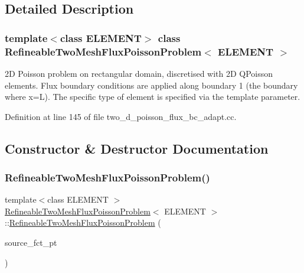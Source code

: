 \subsection{Detailed Description}
\subsubsection*{template$<$class E\+L\+E\+M\+E\+NT$>$\newline
class Refineable\+Two\+Mesh\+Flux\+Poisson\+Problem$<$ E\+L\+E\+M\+E\+N\+T $>$}

2D Poisson problem on rectangular domain, discretised with 2D Q\+Poisson elements. Flux boundary conditions are applied along boundary 1 (the boundary where x=L). The specific type of element is specified via the template parameter. 

Definition at line 145 of file two\+\_\+d\+\_\+poisson\+\_\+flux\+\_\+bc\+\_\+adapt.\+cc.



\subsection{Constructor \& Destructor Documentation}
\mbox{\label{classRefineableTwoMeshFluxPoissonProblem_a6568980564c4e39544b1c2bcb71cf3b6}} 
\subsubsection{\texorpdfstring{Refineable\+Two\+Mesh\+Flux\+Poisson\+Problem()}{RefineableTwoMeshFluxPoissonProblem()}}
{\footnotesize\ttfamily template$<$class E\+L\+E\+M\+E\+NT $>$ \\
\hyperlink{classRefineableTwoMeshFluxPoissonProblem}{Refineable\+Two\+Mesh\+Flux\+Poisson\+Problem}$<$ E\+L\+E\+M\+E\+NT $>$\+::\hyperlink{classRefineableTwoMeshFluxPoissonProblem}{Refineable\+Two\+Mesh\+Flux\+Poisson\+Problem} (\begin{DoxyParamCaption}\item[{Poisson\+Equations$<$ 2 $>$\+::Poisson\+Source\+Fct\+Pt}]{source\+\_\+fct\+\_\+pt }\end{DoxyParamCaption})}



